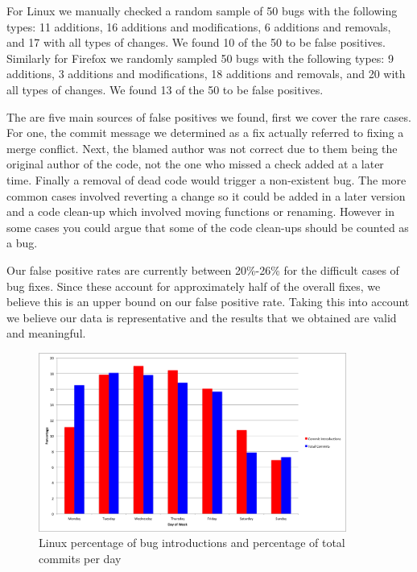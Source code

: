 For Linux we manually checked a random sample of 50 bugs with the
following types: 11 additions, 16 additions and modifications, 6 additions
and removals, and 17 with all types of changes. We found 10 of the 50
to be false positives. Similarly for Firefox we randomly sampled 50
bugs with the following types: 9 additions, 3 additions and
modifications, 18 additions and removals, and 20 with all types of
changes. We found 13 of the 50 to be false positives.

The are five main sources of false positives we found, first we cover
the rare cases. For one, the commit message we determined as a fix
actually referred to fixing a merge conflict. Next, the blamed author
was not correct due to them being the original author of the code, not
the one who missed a check added at a later time. Finally a removal of
dead code would trigger a non-existent bug. The more common cases
involved reverting a change so it could be added in a later version
and a code clean-up which involved moving functions or
renaming. However in some cases you could argue that some of the code
clean-ups should be counted as a bug.

Our false positive rates are currently between 20\%-26\% for the
difficult cases of bug fixes. Since these account for approximately
half of the overall fixes, we believe this is an upper bound on our
false positive rate. Taking this into account we believe our data is
representative and the results that we obtained are valid and meaningful.

\begin{figure}
\begin{center}
\includegraphics[width=0.9\textwidth]{linux_bug_introduction_day_of_week.png}
\end{center}
\caption{Linux percentage of bug introductions and percentage of total commits per day}
\label{fig-linux-weekday}
\end{figure}

